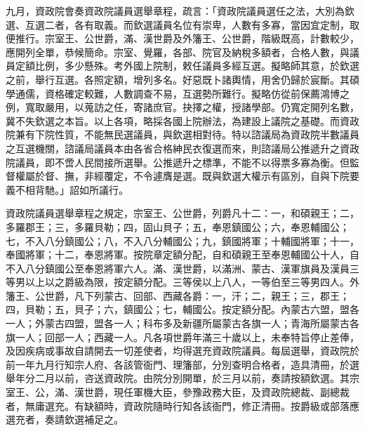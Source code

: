 \begin{pinyinscope}
九月，資政院會奏資政院議員選舉章程，疏言：「資政院議員選任之法，大別為欽選、互選二者，各有取義。而欽選議員名位有崇卑，人數有多寡，當因宜定制，取便推行。宗室王、公世爵，滿、漢世爵及外籓王、公世爵，階級既高，計數較少，應開列全單，恭候簡命。宗室、覺羅，各部、院官及納稅多額者，合格人數，與議員定額比例，多少懸殊。考外國上院制，敕任議員多經互選。擬略師其意，於欽選之前，舉行互選。各照定額，增列多名。好惡既卜諸輿情，用舍仍歸於宸斷。其碩學通儒，資格確定較難，人數調查不易，互選勢所難行。擬略仿從前保薦鴻博之例，寬取嚴用，以蒐訪之任，寄諸庶官。抉擇之權，授諸學部。仍寬定開列名數，冀不失欽選之本旨。以上各項，略採各國上院辦法，為建設上議院之基礎。而資政院兼有下院性質，不能無民選議員，與欽選相對待。特以諮議局為資政院半數議員之互選機關，諮議局議員本由各省合格紳民衣復選而來，則諮議局公推遞升之資政院議員，即不啻人民間接所選舉。公推遞升之標準，不能不以得票多寡為衡。但監督權屬於督、撫，非經覆定，不令遽膺是選。既與欽選大權示有區別，自與下院要義不相背馳。」詔如所議行。

資政院議員選舉章程之規定，宗室王、公世爵，列爵凡十二：一，和碩親王；二，多羅郡王；三，多羅貝勒；四，固山貝子；五，奉恩鎮國公；六，奉恩輔國公；七，不入八分鎮國公；八，不入八分輔國公；九，鎮國將軍；十輔國將軍；十一，奉國將軍；十二，奉恩將軍。按院章定額分配，自和碩親王至奉恩輔國公十人，自不入八分鎮國公至奉恩將軍六人。滿、漢世爵，以滿洲、蒙古、漢軍旗員及漢員三等男以上以之爵級為限，按定額分配。三等侯以上八人，一等伯至三等男四人。外籓王、公世爵，凡下列蒙古、回部、西藏各爵：一，汗；二，親王；三，郡王；四，貝勒；五，貝子；六，鎮國公；七，輔國公。按定額分配。內蒙古六盟，盟各一人；外蒙古四盟，盟各一人；科布多及新疆所屬蒙古各旗一人；青海所屬蒙古各旗一人；回部一人；西藏一人。凡各項世爵年滿三十歲以上，未奉特旨停止差俸，及因疾病或事故自請開去一切差使者，均得選充資政院議員。每屆選舉，資政院於前一年九月行知宗人府、各該管衙門、理籓部，分別查明合格者，造具清冊，於選舉年分二月以前，咨送資政院。由院分別開單，於三月以前，奏請按額欽選。其宗室王、公，滿、漢世爵，現任軍機大臣，參豫政務大臣，及資政院總裁、副總裁者，無庸選充。有缺額時，資政院隨時行知各該衙門，修正清冊。按爵級或部落應選充者，奏請欽選補足之。


\end{pinyinscope}
